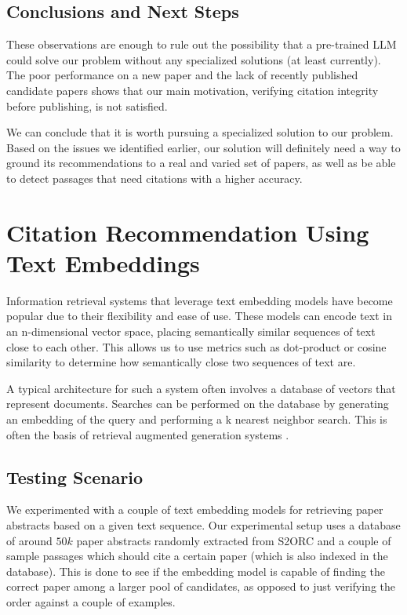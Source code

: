 \documentclass[12pt,a4paper]{report}
\begin{document}
\subsection{Conclusions and Next Steps}

These observations are enough to rule out the possibility that a pre-trained LLM could solve our problem without any specialized solutions (at least currently). The poor performance on a new paper and the lack of recently published candidate papers shows that our main motivation, verifying citation integrity before publishing, is not satisfied.

We can conclude that it is worth pursuing a specialized solution to our problem. Based on the issues we identified earlier, our solution will definitely need a way to ground its recommendations to a real and varied set of papers, as well as be able to detect passages that need citations with a higher accuracy. 

\section{Citation Recommendation Using Text Embeddings}

Information retrieval systems that leverage text embedding models have become popular due to their flexibility and ease of use. These models can encode text in an n-dimensional vector space, placing semantically similar sequences of text close to each other. This allows us to use metrics such as dot-product or cosine similarity to determine how semantically close two sequences of text are.

A typical architecture for such a system often involves a database of vectors that represent documents. Searches can be performed on the database by generating an embedding of the query and performing a k nearest neighbor search. This is often the basis of retrieval augmented generation systems \cite{Lewis2020RetrievalAugmentedGF}.

\subsection{Testing Scenario}

We experimented with a couple of text embedding models for retrieving paper abstracts based on a given text sequence. Our experimental setup uses a database of around \(50k\) paper abstracts randomly extracted from S2ORC \cite{Lo2020S2ORCTS} and a couple of sample passages which should cite a certain paper (which is also indexed in the database). This is done to see if the embedding model is capable of finding the correct paper among a larger pool of candidates, as opposed to just verifying the order against a couple of examples.
\end{document}
